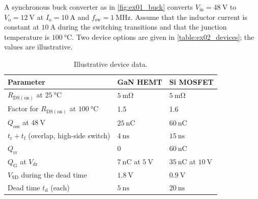 

A synchronous buck converter as in \autoref{fig:ex01_buck} converts $V_\mathrm{in}=\SI{48}{\volt}$ to $V_\mathrm{o}=\SI{12}{\volt}$ at $I_\mathrm{o}=\SI{10}{\ampere}$ and $f_\mathrm{sw}=\SI{1}{\mega\hertz}$. Assume that the inductor current is constant at $\SI{10}{\ampere}$ during the switching transitions and that the junction temperature is $\SI{100}{\celsius}$. Two device options are given in \autoref{table:ex02_devices}; the values are illustrative.

\begin{table}[ht]
	\centering
	\begin{tabular}{lll}
		\toprule
		Parameter                                              & GaN HEMT                       & Si MOSFET                       \\
		\midrule
		$R_\mathrm{DS(on)}$ at $\SI{25}{\celsius}$             & $\SI{5}{\milli\ohm}$           & $\SI{5}{\milli\ohm}$            \\
		Factor for $R_\mathrm{DS(on)}$ at $\SI{100}{\celsius}$ & 1.5                            & 1.6                             \\
		$Q_\mathrm{oss}$ at $\SI{48}{\volt}$                   & $\SI{25}{\nano\coulomb}$       & $\SI{60}{\nano\coulomb}$        \\
		$t_\mathrm{r}+t_\mathrm{f}$ (overlap, high-side switch) & $\SI{4}{\nano\second}$        & $\SI{15}{\nano\second}$         \\
		$Q_\mathrm{rr}$                                        & 0                              & $\SI{60}{\nano\coulomb}$        \\
		$Q_\mathrm{G}$ at $V_\mathrm{dr}$                      & $\SI{7}{\nano\coulomb}$ at $\SI{5}{\volt}$ & $\SI{35}{\nano\coulomb}$ at $\SI{10}{\volt}$ \\
		$V_\mathrm{SD}$ during the dead time                   & $\SI{1.8}{\volt}$              & $\SI{0.9}{\volt}$               \\
		Dead time $t_\mathrm{d}$ (each)                        & $\SI{5}{\nano\second}$         & $\SI{20}{\nano\second}$         \\
		\bottomrule
	\end{tabular}
	\caption{Illustrative device data.}
	\label{table:ex02_devices}
\end{table}

